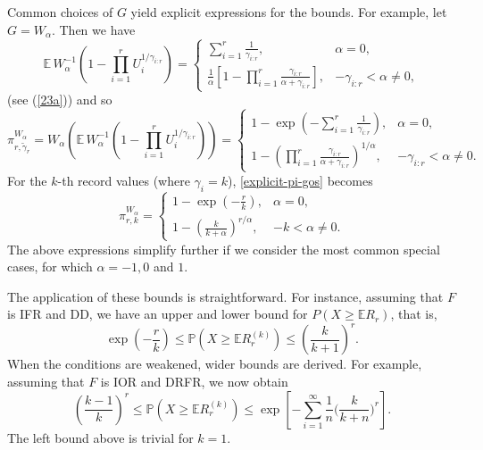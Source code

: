 \documentclass [11pt]{article}
\begin{document}
Common choices of $G$ yield explicit expressions for the bounds. For example, let $G=W_\alpha$. Then we have 
\[
\mathbb E\,W_\alpha^{-1}\left(1-\prod_{i=1}^{r}U_i^{1/\gamma_{i:r}}\right) =
\left\{ 
\begin{array}{ll}
\sum_{i=1}^r \frac{1}{\gamma_{i:r}}, & \alpha=0, \\[1.5ex]
\frac{1}{\alpha} \left[ 1-  %
   \prod_{i=1}^r \frac{\gamma_{i:r}}{\alpha+\gamma_{i:r}}
\right], 
&  -\gamma_{i:r} < \alpha\neq 0,
\end{array}
\right.
\]
(see (\ref{23a})) and so 
\begin{equation}\label{explicit-pi-gos}
\pi^{W_\alpha}_{r,\tilde{\gamma}_r}	 = W_\alpha \left(
\mathbb E\,W_\alpha^{-1}\left(1-\prod_{i=1}^{r}U_i^{1/\gamma_{i:r}}\right) \right) =
\left\{ 
\begin{array}{ll}
1- \exp \left( -\sum_{i=1}^r \frac{1}{\gamma_{i:r}}\right), & \alpha=0,\\[1.75ex]
1-\left(
\prod_{i=1}^r \frac{\gamma_{i:r}}{\alpha+\gamma_{i:r}} 
\right)^{1/\alpha}, & -\gamma_{i:r} < \alpha \neq 0. 
\end{array}
\right.
\end{equation}
For the $k$-th record values (where $\gamma_i=k$), \eqref{explicit-pi-gos} becomes 
\[ %
\pi^{W_\alpha}_{r,k}
=
\left\{
\begin{array}{ll}
1-\exp \left(-\frac{r}{k}\right), & \alpha=0, \\[1.5ex]
1-\left(\frac{k}{k+\alpha}\right)^{r/\alpha}, & -k <\alpha \neq 0.
\end{array}
\right.
\]%
The above expressions simplify further if we consider the most common special cases, for which $\alpha=-1,0$ and $1$.

The application of these bounds is straightforward. For instance, assuming that $F$ is IFR and DD, we have an upper and lower bound for $P(X\geq \mathbb E R_r)$, that is,
$$
\exp\left(-\frac{r}{k}\right)\leq \mathbb{P}(X\geq \mathbb E R_r^{(k)}) \leq \left(\frac{k}{k+1}\right)^r.
$$
When the conditions are weakened, wider bounds are derived. For example, assuming that $F$ is IOR and DRFR, we now obtain
$$
\left(\frac{k-1}{k}\right)^r\leq \mathbb{P}(X\geq \mathbb E R_r^{(k)}) \leq \exp\left[ -\sum_{i=1}^\infty \frac 1n\bigg(\frac k{k+n}\bigg)^r\right].
$$
The left bound above is trivial for $k=1$.
\end{document}
